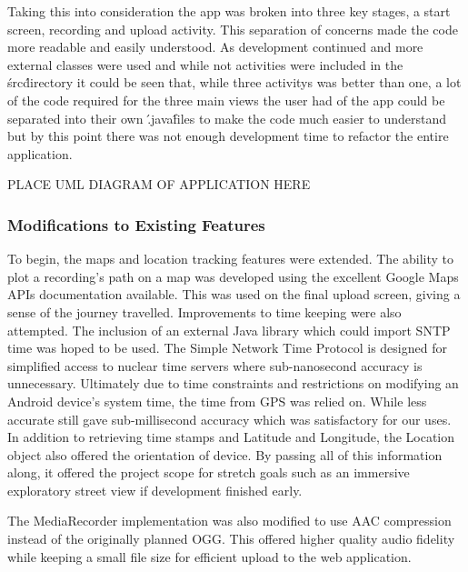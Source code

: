 \documentclass{l3proj}
\begin{document}
Taking this into consideration the app was broken into three key stages, a start screen, recording and upload activity. This separation of concerns made the code more readable and easily understood. As development continued and more external classes were used and while not activities were included in the \'src\' directory it could be seen that, while three activitys was better than one, a lot of the code required for the three main views the user had of the app could be separated into their own \'.java\' files to make the code much easier to understand but by this point there was not enough development time to refactor the entire application.

PLACE UML DIAGRAM OF APPLICATION HERE

\subsubsection{Modifications to Existing Features}
To begin, the maps and location tracking features were extended. The ability to plot a recording’s path on a map was developed using the excellent Google Maps APIs documentation available. This was used on the final upload screen, giving a sense of the journey travelled. Improvements to time keeping were also attempted. The inclusion of an external Java library which could import SNTP time was hoped to be used. The Simple Network Time Protocol is designed for simplified access to nuclear time servers where sub-nanosecond accuracy is unnecessary. Ultimately due to time constraints and restrictions on modifying an Android device’s system time, the time from GPS was relied on. While less accurate still gave sub-millisecond accuracy which was satisfactory for our uses. In addition to retrieving time stamps and Latitude and Longitude, the Location object also offered the orientation of device. By passing all of this information along, it offered the project scope for stretch goals such as an immersive exploratory street view if development finished early.

The MediaRecorder implementation was also modified to use AAC compression instead of the originally planned OGG. This offered higher quality audio fidelity while keeping a small file size for efficient upload to the web application.
\end{document}
